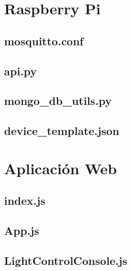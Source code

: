 \section{Raspberry Pi} \label{anexo-rpi}



\subsection{mosquitto.conf} \label{anexo-mosquitto.conf}



\subsection{api.py} \label{api.py}



\subsection{mongo\_db\_utils.py} \label{anexo-falsk-mongo}



\subsection{device\_template.json} \label{anexo-device-template}





\section{Aplicación Web} \label{anexo-app-web}



\subsection{index.js} \label{anexo-index.js}



\subsection{App.js} \label{anexo-app.js}



\subsection{LightControlConsole.js} \label{anexo-lightcontrolconsole.js}






